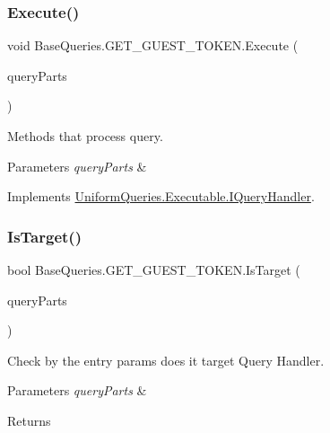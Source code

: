 \subsubsection{\texorpdfstring{Execute()}{Execute()}}
{\footnotesize\ttfamily void Base\+Queries.\+G\+E\+T\+\_\+\+G\+U\+E\+S\+T\+\_\+\+T\+O\+K\+E\+N.\+Execute (\begin{DoxyParamCaption}\item[{\mbox{\hyperlink{struct_uniform_queries_1_1_query_part}{Query\+Part}} \mbox{[}$\,$\mbox{]}}]{query\+Parts }\end{DoxyParamCaption})}



Methods that process query. 


\begin{DoxyParams}{Parameters}
{\em query\+Parts} & \\
\hline
\end{DoxyParams}


Implements \mbox{\hyperlink{interface_uniform_queries_1_1_executable_1_1_i_query_handler_a3268d72c0388f5e3debba4d73bdfe523}{Uniform\+Queries.\+Executable.\+I\+Query\+Handler}}.

\mbox{\label{class_base_queries_1_1_g_e_t___g_u_e_s_t___t_o_k_e_n_adb9e113e010750eeedd261ce6811da1c}} 
\subsubsection{\texorpdfstring{Is\+Target()}{IsTarget()}}
{\footnotesize\ttfamily bool Base\+Queries.\+G\+E\+T\+\_\+\+G\+U\+E\+S\+T\+\_\+\+T\+O\+K\+E\+N.\+Is\+Target (\begin{DoxyParamCaption}\item[{\mbox{\hyperlink{struct_uniform_queries_1_1_query_part}{Query\+Part}} \mbox{[}$\,$\mbox{]}}]{query\+Parts }\end{DoxyParamCaption})}



Check by the entry params does it target Query Handler. 


\begin{DoxyParams}{Parameters}
{\em query\+Parts} & \\
\hline
\end{DoxyParams}
\begin{DoxyReturn}{Returns}

\end{DoxyReturn}


